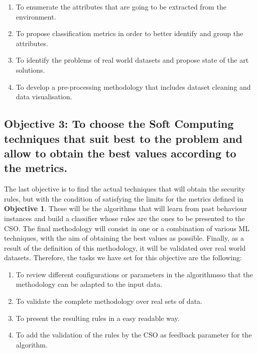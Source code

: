 \begin{enumerate}
	\item To enumerate the attributes that are going to be extracted from the environment.
	\item To propose classification metrics in order to better identify and group the attributes.
	\item To identify the problems of real world datasets and propose state of the art solutions.
	\item To develop a pre-processing methodology that includes dataset cleaning and data visualisation.
\end{enumerate}


\newcommand{\objectivetechniques}{To choose the Soft Computing techniques that suit best to the problem and allow to obtain the best values according to the metrics.} 

\subsection*{Objective 3: \objectivetechniques}
\label{subsec:intro:obj:fwork} 

The last objective is to find the actual techniques that will obtain the security rules, but with the condition of satisfying the limits for the metrics defined in \textbf{Objective 1}. These will be the algorithms that will learn from past behaviour instances and build a classifier whose rules are the ones to be presented to the CSO. The final methodology will consist in one or a combination of various ML techniques, with the aim of obtaining the best values as possible. Finally, as a result of the definition of this methodology, it will be validated over real world datasets. Therefore, the tasks we have set for this objective are the following:

\begin{enumerate}
	\item To review different configurations or parameters in the algorithmsso that the methodology can be adapted to the input data.
	\item To validate the complete methodology over real sets of data. %
	\item To present the resulting rules in a easy readable way.
	\item To add the validation of the rules by the CSO as feedback parameter for the algorithm. %
\end{enumerate}

